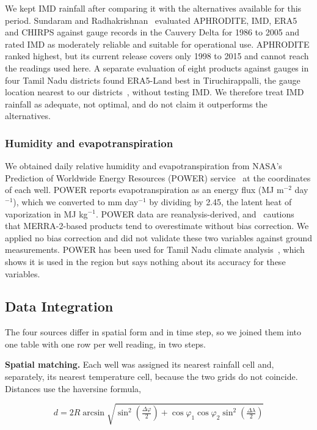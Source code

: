 \documentclass[conference]{IEEEtran}
\begin{document}
We kept IMD rainfall after comparing it with the alternatives available for this period. Sundaram and Radhakrishnan~\cite{ref17} evaluated APHRODITE, IMD, ERA5 and CHIRPS against gauge records in the Cauvery Delta for 1986 to 2005 and rated IMD as moderately reliable and suitable for operational use. APHRODITE ranked highest, but its current release covers only 1998 to 2015 and cannot reach the readings used here. A separate evaluation of eight products against gauges in four Tamil Nadu districts found ERA5-Land best in Tiruchirappalli, the gauge location nearest to our districts~\cite{ref18}, without testing IMD. We therefore treat IMD rainfall as adequate, not optimal, and do not claim it outperforms the alternatives.

\subsubsection{Humidity and evapotranspiration}

We obtained daily relative humidity and evapotranspiration from NASA's Prediction of Worldwide Energy Resources (POWER) service~\cite{ref19} at the coordinates of each well. POWER reports evapotranspiration as an energy flux (MJ m\ensuremath{^{-2}} day\ensuremath{^{-1}}), which we converted to mm day\ensuremath{^{-1}} by dividing by 2.45, the latent heat of vaporization in MJ kg\ensuremath{^{-1}}. POWER data are reanalysis-derived, and~\cite{ref18} cautions that MERRA-2-based products tend to overestimate without bias correction. We applied no bias correction and did not validate these two variables against ground measurements. POWER has been used for Tamil Nadu climate analysis~\cite{ref20}, which shows it is used in the region but says nothing about its accuracy for these variables.

\subsection{Data Integration}

The four sources differ in spatial form and in time step, so we joined them into one table with one row per well reading, in two steps.

\textbf{Spatial matching.} Each well was assigned its nearest rainfall cell and, separately, its nearest temperature cell, because the two grids do not coincide. Distances use the haversine formula,

\begin{equation}
d = 2R \arcsin\sqrt{\sin^2\!\left(\tfrac{\Delta\varphi}{2}\right) + \cos\varphi_1 \cos\varphi_2 \sin^2\!\left(\tfrac{\Delta\lambda}{2}\right)}\label{eq:1}
\end{equation}
\end{document}
